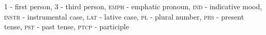 \documentclass[b5paper,notitlepage]{article}
\newif\ifcameraready
\begin{document}
\ifcameraready

\section*{Acknowledgements}

We would like to express our endless gratitude to all our Mansi language consultants, especially to Tatiana Bakhtiyarova and Valeriy Anyamov, who have provided great aid in the organization of our field trips to the Upper Lozva dialect. Пӯмащӣпа!

\section*{List of glosses}

\fi 1 - first person, 3 - third person, \textsc{emph} - emphatic pronoun, \textsc{ind} - indicative mood, \textsc{instr} - instrumental case, \textsc{lat} - lative case, \textsc{pl} - plural number, \textsc{prs} - present tense, \textsc{pst} - past tense, \textsc{ptcp} - participle

\medskip
 
\end{document}
